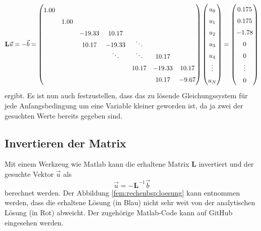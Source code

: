 \begin{equation*}
    \def\arraystretch{1.5}
    \mathbf{L}\vec{u} 
    = -\vec{b} 
    = \begin{pmatrix}
         1.00  &        &        &                &                &        &        \\
               &  1.00  &        &                &                &        &        \\
               &        &-19.33  & 10.17          &                &        &        \\
               &        & 10.17  &-19.33          & \smash{\ddots} &        &        \\
               &        &        & \smash{\ddots} & \smash{\ddots} & 10.17  &        \\
               &        &        &                & 10.17          &-19.33  & 10.17  \\
               &        &        &                &                & 10.17  & -9.67  
    \end{pmatrix}
    \begin{pmatrix}
        u_0 \\ u_1 \\ u_2 \\ u_3 \\ u_4 \\ \vdots \\ u_N
    \end{pmatrix}
    =
    \begin{pmatrix}
        0.175 \\ 0.175 \\ -1.78 \\ 0 \\ 0 \\ \vdots \\ 0
    \end{pmatrix}
\end{equation*}
ergibt.
Es ist nun auch festzustellen, dass das zu lösende Gleichungssystem
für jede Anfangsbedingung um eine Variable kleiner geworden ist,
da ja zwei der gesuchten Werte bereits gegeben sind.


\subsection{Invertieren der Matrix}
Mit einem Werkzeug wie Matlab kann die erhaltene Matrix $\mathbf{L}$ invertiert und der gesuchte Vektor $\vec{u}$ als 
\begin{equation*}
    \vec{u} = - \mathbf{L}^{-1} \vec{b}
\end{equation*}
berechnet werden.
Der Abbildung \ref{fem:rechenbsp:loesung} kann entnommen werden, dass die erhaltene Lösung (in Blau) nicht sehr weit von der analytischen Lösung (in Rot) abweicht.
Der zugehörige Matlab-Code kann auf GitHub \cite{fem:bib:matlab} eingesehen werden.
